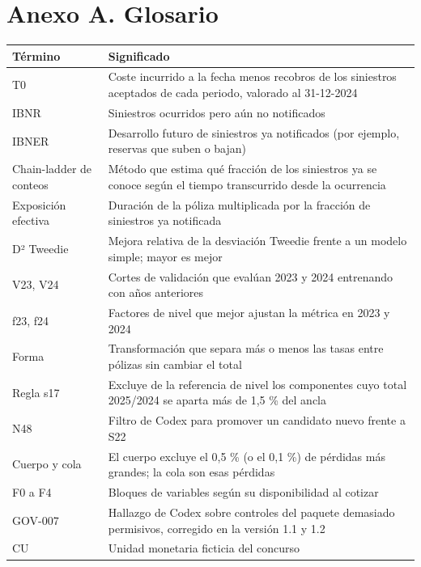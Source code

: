 \documentclass[11pt,a4paper]{article}
\begin{document}
\appendix
\section{Anexo A. Glosario}

\begin{tabularx}{\linewidth}{@{}P{3.4cm}L@{}}
\toprule
Término & Significado \\
\midrule
T0 & Coste incurrido a la fecha menos recobros de los siniestros aceptados de cada periodo, valorado al 31-12-2024 \\
IBNR & Siniestros ocurridos pero aún no notificados \\
IBNER & Desarrollo futuro de siniestros ya notificados (por ejemplo, reservas que suben o bajan) \\
Chain-ladder de conteos & Método que estima qué fracción de los siniestros ya se conoce según el tiempo transcurrido desde la ocurrencia \\
Exposición efectiva & Duración de la póliza multiplicada por la fracción de siniestros ya notificada \\
D² Tweedie & Mejora relativa de la desviación Tweedie frente a un modelo simple; mayor es mejor \\
V23, V24 & Cortes de validación que evalúan 2023 y 2024 entrenando con años anteriores \\
f23, f24 & Factores de nivel que mejor ajustan la métrica en 2023 y 2024 \\
Forma & Transformación que separa más o menos las tasas entre pólizas sin cambiar el total \\
Regla s17 & Excluye de la referencia de nivel los componentes cuyo total 2025/2024 se aparta más de 1,5 \% del ancla \\
N48 & Filtro de Codex para promover un candidato nuevo frente a S22 \\
Cuerpo y cola & El cuerpo excluye el 0,5 \% (o el 0,1 \%) de pérdidas más grandes; la cola son esas pérdidas \\
F0 a F4 & Bloques de variables según su disponibilidad al cotizar \\
GOV-007 & Hallazgo de Codex sobre controles del paquete demasiado permisivos, corregido en la versión 1.1 y 1.2 \\
CU & Unidad monetaria ficticia del concurso \\
\bottomrule
\end{tabularx}
\end{document}

